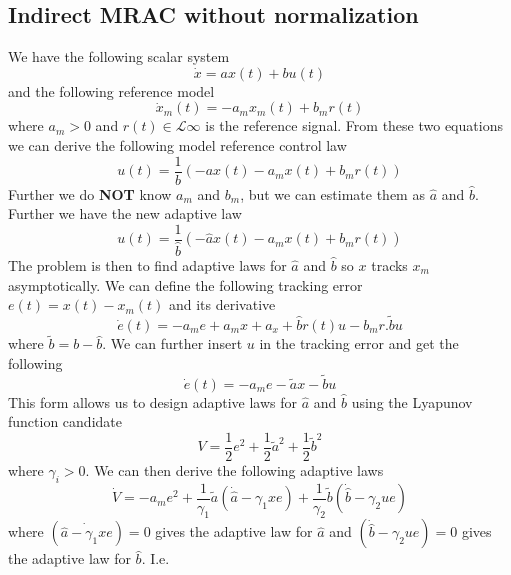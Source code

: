 \documentclass[10pt]{article}
\begin{document}
\begin{multicols*}{2}
\subsection{Indirect MRAC without normalization}
We have the following scalar system
\begin{equation*}
	\dot x = a x(t) + b u(t)
\end{equation*}
and the following reference model
\begin{equation*}
	\dot x_m (t) = -a_m x_m(t) + b_m r(t)
\end{equation*}
where $a_m > 0$  and $r(t) \in  \mathcal{L}{\infty}$ is the reference signal. From these two equations we can derive the following model reference control law
\begin{equation*}
	u(t) = \frac{1}{b}(-a x(t) - a_m x(t) + b_m r(t))
\end{equation*}
Further we do \textbf{NOT} know $a_m$ and $b_m$, but we can estimate them as $\hat{a}$ and $\hat{b}$. Further we have the new adaptive law
\begin{equation*}
	u(t) = \frac{1}{\hat{b}}(- \hat{a} x(t) - a_m x(t) + b_m r(t))
\end{equation*}
The problem is then to find adaptive laws for $\hat{a}$ and $\hat{b}$ so $x$ tracks $x_m$ asymptotically. We can define the following tracking error $e(t) = x(t) - x_m(t)$ and its derivative
\begin{equation*}
	\dot e(t) = -a_m e + a_m x + a_x + \hat{b} r(t) u - b_m r . \tilde{b} u
\end{equation*}
where $\tilde{b} = b - \hat{b}$. We can further insert $u$ in the tracking error and get the following
\begin{equation*}
	\dot e(t) = -a_m e - \tilde{a} x - \tilde{b}u
\end{equation*}
This form allows us to design adaptive laws for $\hat{a}$ and $\hat{b}$ using the Lyapunov function candidate
\begin{equation*}
	V = \frac{1}{2} e^2 + \frac{1}{2} \tilde{a}^2 + \frac{1}{2} \tilde{b}^2
\end{equation*}
where $\gamma_i > 0$. We can then derive the following adaptive laws
\begin{equation*}
	\dot V = -a_m e ^2 + \frac{1}{\gamma_1} \tilde{a} (\dot{\hat{a}} - \gamma_1 x e) + \frac{1}{\gamma_2} \tilde{b} (\dot{\hat{b}} - \gamma_2 u e)
\end{equation*}
where $(\dot{\hat{a} - \gamma_1 x e}) = 0$ gives the adaptive law for $\hat{a} $ and $(\dot{\hat{b}} - \gamma_2 u e) = 0$ gives the adaptive law for $\hat{b}$. I.e.

\end{multicols*}
\end{document}
